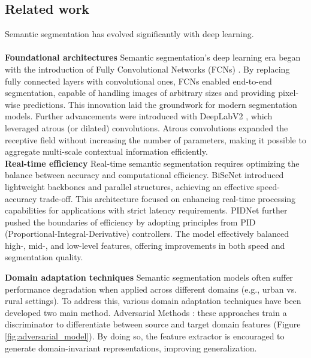 \documentclass{article}
\begin{document}
	\begin{multicols}{2}


		\section{Related work}
		Semantic segmentation has evolved significantly with deep learning. 
		\\
		\\
		\textbf{Foundational architectures}
		Semantic segmentation's deep learning era began with the introduction of Fully Convolutional Networks (FCNs) \cite{long2015fcn}. By replacing fully connected layers with convolutional ones, FCNs enabled end-to-end segmentation, capable of handling images of arbitrary sizes and providing pixel-wise predictions. This innovation laid the groundwork for modern segmentation models.
		Further advancements were introduced with DeepLabV2 \cite{chen2018deeplab}, which leveraged atrous (or dilated) convolutions. Atrous convolutions expanded the receptive field without increasing the number of parameters, making it possible to aggregate multi-scale contextual information efficiently.
		\\




		\textbf{Real-time efficiency}
		Real-time semantic segmentation requires optimizing the balance between accuracy and computational efficiency. BiSeNet \cite{yu2018bisenet} introduced lightweight backbones and parallel structures, achieving an effective speed-accuracy trade-off. This architecture focused on enhancing real-time processing capabilities for applications with strict latency requirements. PIDNet \cite{pidnet2023} further pushed the boundaries of efficiency by adopting principles from PID (Proportional-Integral-Derivative) controllers. The model effectively balanced high-, mid-, and low-level features, offering improvements in both speed and segmentation quality.
		
		\textbf{Domain adaptation techniques}
		Semantic segmentation models often suffer performance degradation when applied across different domains (e.g., urban vs. rural settings). To address this, various domain adaptation techniques have been developed two main method. Adversarial Methods \cite{tsai2018learning}: these approaches train a discriminator to differentiate between source and target domain features (Figure \ref{fig:adversarial_model}). By doing so, the feature extractor is encouraged to generate domain-invariant representations, improving generalization.


\end{multicols}
\end{document}

